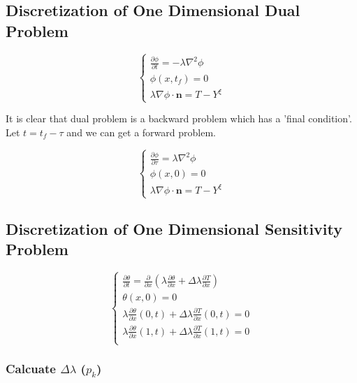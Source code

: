 \documentclass[UTF-8]{article}
\begin{document}
\subsection{Discretization of One Dimensional Dual Problem}
\begin{equation}
	\left\{
	\begin{array}{l}
		\frac{\partial \phi}{\partial t} = - \lambda \nabla^2 \phi \\
		\phi(x, t_f) = 0 \\
		\lambda \nabla \phi \cdot \pmb{n} = T - Y^\xi
	\end{array}
	\right.
\end{equation}

It is clear that dual problem is a backward problem which has a 'final condition'. Let $t = t_f - \tau$ and we can get a forward problem.

\begin{equation}
	\left\{
	\begin{array}{l}
		\frac{\partial \phi}{\partial \tau} = \lambda \nabla^2 \phi \\
		\phi(x, 0) = 0 \\
		\lambda \nabla \phi \cdot \pmb{n} = T - Y^\xi
	\end{array}
	\right.
\end{equation}

\subsection{Discretization of One Dimensional Sensitivity Problem}

\begin{equation}
	\left\{
	\begin{array}{l}
		\frac{\partial \theta}{\partial t} = \frac{\partial}{\partial x} \left( \lambda \frac{\partial \theta}{\partial x} + \Delta \lambda \frac{\partial T}{\partial x} \right) \\
		\theta (x, 0) = 0 \\
		\lambda \frac{\partial \theta}{\partial x}(0, t) + \Delta \lambda \frac{\partial T}{\partial x}(0, t) = 0 \\
		\lambda \frac{\partial \theta}{\partial x}(1, t) + \Delta \lambda \frac{\partial T}{\partial x}(1, t) = 0 \\
	\end{array}
	\right.
\end{equation}

\subsubsection{Calcuate $\Delta \lambda$ ($p_k$)}
\end{document}
